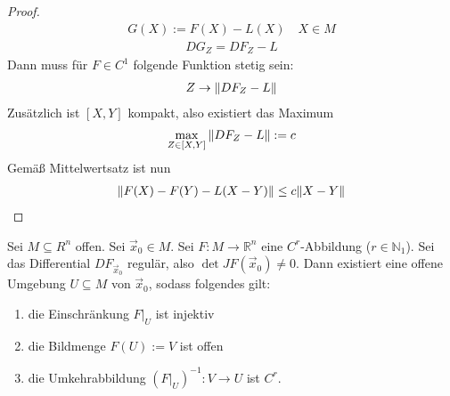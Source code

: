 \documentclass{report}
\newcommand{\bN}{\mathbb{N}}
\newcommand{\bR}{\mathbb{R}}
\newcommand{\vx}{\vec{x}}
\begin{document}
\begin{proof}
 \begin{align*}
  G(X) := F(X) - L(X) \quad X \in M
 \end{align*}
 \begin{align*}
  DG_Z = DF_Z - L
 \end{align*}
 Dann muss für $F \in C^1$ folgende Funktion stetig sein:
 \begin{align*}
  Z \to \norm{DF_Z - L}
 \end{align*}
 Zusätzlich ist $[X,Y]$ kompakt, also existiert das Maximum
 \begin{align*}
  \max_{Z \in [X,Y]} \norm{DF_Z - L} := c
 \end{align*}
 Gemäß Mittelwertsatz ist nun
 \begin{align*}
  \norm{F(X) - F(Y) - L(X-Y)} \leq c \norm{X - Y}
 \end{align*}
\end{proof}
\begin{theorem}
 Sei $M \subseteq R^n$ offen. Sei $\vx_0 \in M$. Sei $F : M \to \bR^n$ eine $C^r$-Abbildung ($r \in \bN_1$). Sei das Differential $DF_{\vx_0}$ regulär, also $\det JF(\vx_0) \neq 0$. Dann existiert eine offene Umgebung $U \subseteq M$ von $ \vx_0$, sodass folgendes gilt:
 \begin{enumerate}
  \item die Einschränkung $F|_U$ ist injektiv
  \item die Bildmenge $F(U) := V$ ist offen
  \item die Umkehrabbildung $(F|_U)^{-1} : V \to U$ ist $C^r$. 
 \end{enumerate}
\end{theorem}
\end{document}

